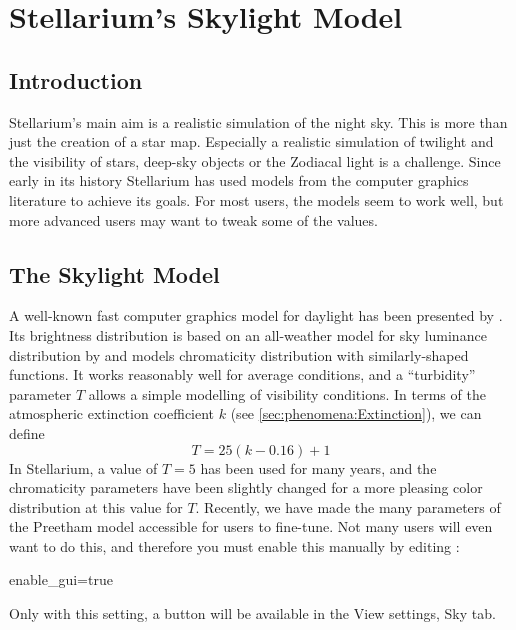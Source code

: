 
\chapter{Stellarium's Skylight Model}
\label{ch:skylight}

\section{Introduction}
\label{sec:skylight:introduction}

Stellarium's main aim is a realistic simulation of the night sky. This
is more than just the creation of a star map. Especially a realistic
simulation of twilight and the visibility of stars, deep-sky objects
or the Zodiacal light is a challenge. Since early in its history
Stellarium has used models from the computer graphics literature to
achieve its goals. For most users, the models seem to work well, but
more advanced users may want to tweak some of the values.

\section{The Skylight Model}

A well-known fast computer graphics model for daylight has been
presented by \citet{Preetham:1999}. Its brightness distribution is
based on an all-weather model for sky luminance distribution by
\citet{Perez:1993} and models chromaticity distribution with
similarly-shaped functions. It works reasonably well for average
conditions, and a ``turbidity'' parameter $T$ allows a simple
modelling of visibility conditions. In terms of the atmospheric
extinction coefficient $k$ (see \ref{sec:phenomena:Extinction}), we
can define
\begin{equation}
  T=25(k-0.16)+1
  \label{eq:TfromK}
\end{equation}
In Stellarium, a value of $T=5$ has been used for many years, and the
chromaticity parameters have been slightly changed for a more pleasing
color distribution at this value for $T$. Recently,
 we have made the many parameters of the Preetham
model accessible for users to fine-tune. Not many users will even want to do this,
and therefore you must enable this manually by editing :
\begin{configfile}
  [Skylight]
  enable_gui=true
\end{configfile}

Only with this setting, a button  will be
available in the View settings, Sky tab.

